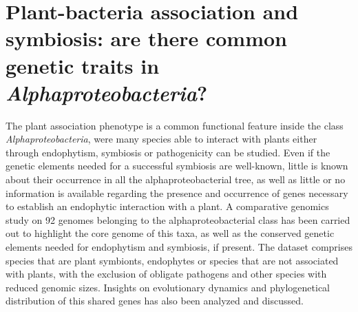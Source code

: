 \section{Plant-bacteria association and symbiosis: are there common genetic traits in \textit{Alphaproteobacteria}?}
The plant association phenotype is a common functional feature inside the class \textit{Alphaproteobacteria}, were many species able to interact with plants either through endophytism, symbiosis or pathogenicity can be studied. Even if the genetic elements needed for a successful symbiosis are well-known, little is known about their occurrence in all the alphaproteobacterial tree, as well as little or no information is available regarding the presence and occurrence of genes necessary to establish an endophytic interaction with a plant. A comparative genomics study on 92 genomes belonging to the alphaproteobacterial class has been carried out to highlight the core genome of this taxa, as well as the conserved genetic elements needed for endophytism and symbiosis, if present. The dataset comprises species that are plant symbionts, endophytes or species that are not associated with plants, with the exclusion of obligate pathogens and other species with reduced genomic sizes. Insights on evolutionary dynamics and phylogenetical distribution of this shared genes has also been analyzed and discussed.

\newpage

\newpage

\backmatter
{}
\renewcommand{\sectionmark}[1]{\markright{#1}}
\sectionmark{Bibliography}
